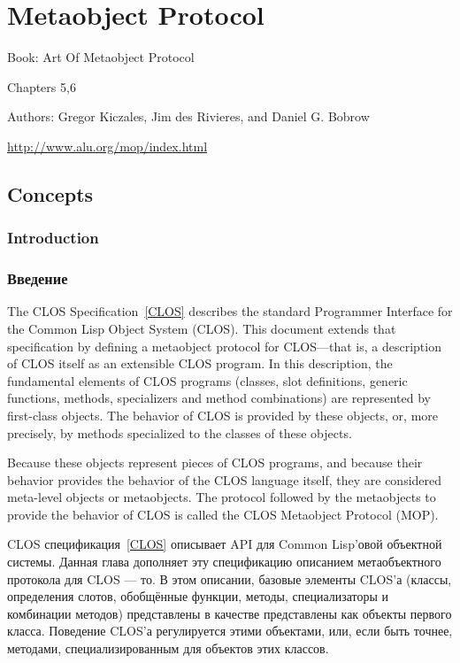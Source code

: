 \clearpage\def\pagestatus{FINAL PROOF}

\chapter{Metaobject Protocol}
\label{METAOBJECT-PROTOCOL}

Book: Art Of Metaobject Protocol

Chapters 5,6

Authors: Gregor Kiczales, Jim des Rivieres, and Daniel G. Bobrow

\href{http://www.alu.org/mop/index.html}{http://www.alu.org/mop/index.html}

\section{Concepts}

\subsection{Introduction}
\subsection{Введение}


The CLOS Specification~\ref{CLOS} describes the standard Programmer Interface for the
Common Lisp Object System (CLOS). This document extends that specification by
defining a metaobject protocol for CLOS---that is, a description of CLOS itself
as an extensible CLOS program. In this description, the fundamental elements of
CLOS programs (classes, slot definitions, generic functions, methods,
specializers and method combinations) are represented by first-class
objects. The behavior of CLOS is provided by these objects, or, more precisely,
by methods specialized to the classes of these objects.

Because these objects represent pieces of CLOS programs, and because their
behavior provides the behavior of the CLOS language itself, they are considered
meta-level objects or metaobjects. The protocol followed by the metaobjects to
provide the behavior of CLOS is called the CLOS Metaobject Protocol (MOP). 

CLOS спецификация~\ref{CLOS} описывает API для Common Lisp'овой объектной
системы. Данная глава дополняет эту спецификацию описанием метаобъектного
протокола для CLOS --- то. В этом описании, базовые элементы CLOS'а (классы,
определения слотов, обобщённые функции, методы, специализаторы и комбинации
методов) представлены в качестве представлены как объекты первого
класса. Поведение CLOS'а регулируется этими объектами, или, если быть точнее,
методами, специализированным для объектов этих классов.

